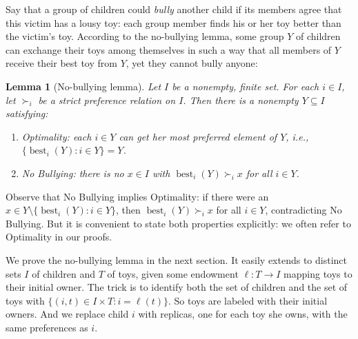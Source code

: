 \documentclass[english, 11pt]{article}
\theoremstyle{plain} %
\newtheorem{lemma}[theorem]{Lemma}
\theoremstyle{definition}
\DeclareMathOperator{\best}{best}
\begin{document}
Say that a group of children could \emph{bully\/} another child if its members agree that this victim has a lousy toy: each group member finds his or her toy better than the victim's toy. According to the no-bullying lemma, some group $Y$ of children can exchange their toys among themselves in such a way that all members of $Y$ receive their best toy from $Y$, yet they cannot bully anyone:

\begin{lemma}[No-bullying lemma]\label{lemma: no bullying}
Let $I$ be a nonempty, finite set. For each $i \in I$, let $\succ_i$ be a strict preference relation on $I$. Then there is a nonempty $Y \subseteq I$ satisfying:
\begin{enumerate}
\item[(a)] Optimality: each $i \in Y$ can get her most preferred element of $Y$, i.e., $\{\best_i(Y): i \in Y\} = Y$.
\item[(b)] No Bullying: there is no $x \in I$ with\/ $\best_i(Y) \succ_i x$ for all $i \in Y$.
\end{enumerate}
\end{lemma}

Observe that No Bullying implies Optimality: if there were an $x \in Y \setminus \{\best_i(Y): i \in Y\}$, then $\best_i(Y) \succ_i x$ for all $i \in Y$, contradicting No Bullying. But it is convenient to state both properties explicitly: we often refer to Optimality in our proofs.

We prove the no-bullying lemma in the next section. It easily extends to distinct sets $I$ of children and $T$ of toys, given some endowment $\ell: T \to I$ mapping toys to their initial owner. The trick is to identify both the set of children and the set of toys with $\{(i, t) \in I \times T: i = \ell(t)\}$. So toys are labeled with their initial owners. And we replace child $i$ with replicas, one for each toy she owns, with the same preferences as $i$.
\end{document}
